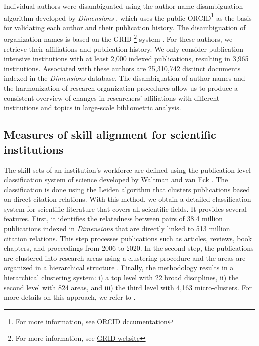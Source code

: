 \documentclass[draft,final]{vutinfth} %
\begin{document}
Individual authors were disambiguated using the author-name disambiguation algorithm developed by {\em Dimensions} \cite{hook2018dimensions}, which uses the public ORCID\footnote{For more information, see \href{https://info.orcid.org/documentation/} {ORCID documentation}} as the basis for validating each author and their publication history. The disambiguation of organization names is based on the GRID \footnote{For more information, see \href{https://www.grid.ac/} { GRID website}} system \cite{bode2018guide}. For these authors, we retrieve their affiliations and publication history. We only consider publication-intensive institutions with at least 2,000 indexed publications, resulting in 3,965 institutions. Associated with these authors are 25,310,742 distinct documents indexed in the {\em Dimensions} database. The disambiguation of author names and the harmonization of research organization procedures allow us to produce a consistent overview of changes in researchers' affiliations with different institutions \cite{machavcek2022researchers} and topics in large-scale bibliometric analysis.

\subsection{Measures of skill alignment for scientific institutions}
\label{Definition of skills section}
The skill sets of an institution's workforce are defined using the publication-level classification system of science developed by Waltman and van Eck \cite{waltman2012new}. The classification is done using the Leiden algorithm 
\cite{traag2019louvain} that clusters publications based on direct citation relations. With this method, we obtain a  detailed classification system for scientific literature that covers all scientific fields. It provides several features. First, it identifies the relatedness between pairs of 38.4 million publications indexed in {\em Dimensions} that are directly linked to 513 million citation relations. This step processes publications such as articles, reviews, book chapters, and proceedings from 2006 to 2020. In the second step, the publications are clustered into research areas using a clustering procedure and the areas are organized in a hierarchical structure \cite{traag2019louvain}. Finally, the methodology results in a hierarchical clustering system: i) a top level with 22 broad disciplines, ii) the second level with 824 areas, and iii) the third level with 4,163 micro-clusters. For more details on this approach, we refer to \cite{waltman2012new, traag2019louvain}.
\end{document}
